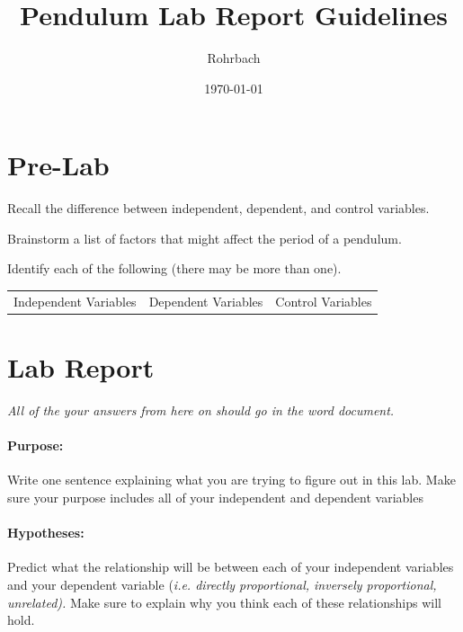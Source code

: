 \documentclass[10pt]{exam}
\title{Pendulum Lab Report Guidelines}
\author{Rohrbach}
\date{\today}
\begin{document}
\maketitle

\section*{Pre-Lab}


\begin{questions}



\question
  Recall the difference between independent, dependent, and control variables.
  \vs 

\question
  Brainstorm a list of factors that might affect the period of a pendulum.
  \vs 

\question
  Identify each of the following (there may be more than one).

  \begin{center}
    \begin{tabular}
      { m{} | m{}| m{} } 
      Independent Variables & 
      Dependent Variables   & 
      Control Variables  \\[10em]
    \end{tabular}
  \end{center}

\end{questions}

\section*{Lab Report}
\emph{All of the your answers from here on should go in the word document.}

\paragraph{Purpose:} 
  Write one sentence explaining what you are trying to figure out in this lab. Make sure your purpose includes all of your independent and dependent variables

\paragraph{Hypotheses:} 
  Predict what the relationship will be between each of your independent variables and your dependent variable (\emph{i.e. directly proportional, inversely proportional, unrelated).} Make sure to explain why you think each of these relationships will hold.
\end{document}
